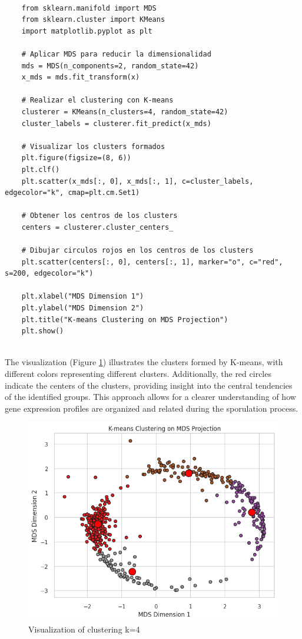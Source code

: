 \documentclass{article}
\begin{document}
\begin{lstlisting}[style=mypython, label=fig:pca_code,caption=Application of PCA method]
	
	from sklearn.manifold import MDS
	from sklearn.cluster import KMeans
	import matplotlib.pyplot as plt
	
	# Aplicar MDS para reducir la dimensionalidad
	mds = MDS(n_components=2, random_state=42)
	x_mds = mds.fit_transform(x)
	
	# Realizar el clustering con K-means
	clusterer = KMeans(n_clusters=4, random_state=42)
	cluster_labels = clusterer.fit_predict(x_mds)
	
	# Visualizar los clusters formados
	plt.figure(figsize=(8, 6))
	plt.clf()
	plt.scatter(x_mds[:, 0], x_mds[:, 1], c=cluster_labels, edgecolor="k", cmap=plt.cm.Set1)
	
	# Obtener los centros de los clusters
	centers = clusterer.cluster_centers_
	
	# Dibujar circulos rojos en los centros de los clusters
	plt.scatter(centers[:, 0], centers[:, 1], marker="o", c="red", s=200, edgecolor="k")
	
	plt.xlabel("MDS Dimension 1")
	plt.ylabel("MDS Dimension 2")
	plt.title("K-means Clustering on MDS Projection")
	plt.show()
	
\end{lstlisting}
The visualization (Figure \ref{fig:mds_k4}) illustrates the clusters formed by K-means, with different colors representing different clusters. Additionally, the red circles indicate the centers of the clusters, providing insight into the central tendencies of the identified groups. This approach allows for a clearer understanding of how gene expression profiles are organized and related during the sporulation process.
\begin{figure}[H]
	\centering
	\includegraphics[width=.6\textwidth]{images/mds_k4.png}
	\caption{Visualization of clustering k=4}
	\label{fig:mds_k4}
\end{figure}
\end{document}
